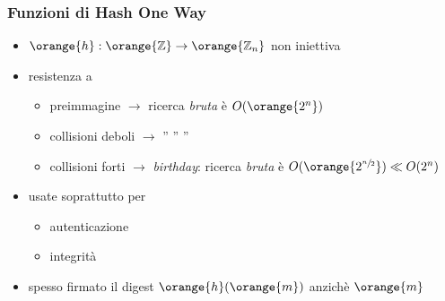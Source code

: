 \begin{frame}
	\frametitle{Funzioni di Hash One Way}

	\begin{itemize}
		\item $\orange{h}:\orange{\mathbb{Z}}\rightarrow \orange{\mathbb{Z}_n}$ non iniettiva

		\item resistenza a
		\begin{itemize}
			\item preimmagine $\rightarrow$ ricerca \textit{bruta} è $O(\orange{2^n})$
			\item collisioni deboli $\rightarrow$ \;\;\;\;\; ''\;\;\;\;\; ''\;\;\;\;\; ''
			\item collisioni forti $\rightarrow$ \textit{birthday}: ricerca \textit{bruta} è $O(\orange{2^{\sfrac{n}{2}}}) \ll O(2^n)$
		\end{itemize}
		
		\item usate soprattutto per
		\begin{itemize}
		  \item autenticazione
		  \item integrità
		\end{itemize}
		\item spesso firmato il {\color{blue}digest} $\orange{h}(\orange{m})$ anzichè $\orange{m}$
	\end{itemize}

\end{frame}